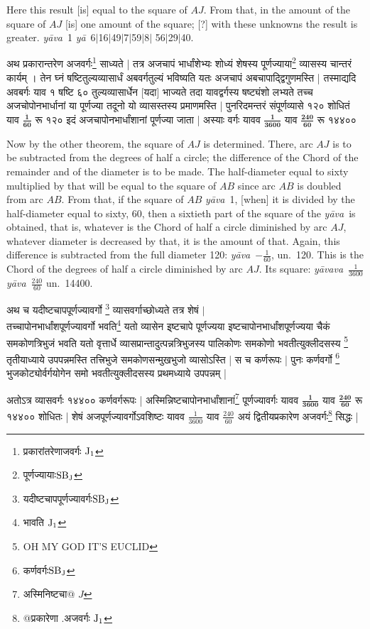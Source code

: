 \documentclass[11pt,a5paper]{book}
\def\ya{\textit{y\=a}}
\def\yava{\textit{y\=ava}}
\def\yavava{\textit{y\=avava}}
\def\danda{$|$}
\begin{document}
Here this result [is] equal to the square of $AJ$. From that, in the amount of the 
square of $AJ$ [is] one amount of the square; [?] with these unknowns the result 
is greater. \yava\ 1 \ya\ 6\danda 16\danda 49\danda 7\danda 59\danda 8\danda
56\danda 29\danda 40. 

\newpage
{\s अथ
प्रकारान्तरेण अजवर्गः\footnote{{\s प्रकारांतरेणाजवर्गः }${\rm J_1}$}
साध्यते |
तत्र अजचापं भार्धांशेभ्यः शोध्यं शेषस्य
पूर्णज्याया\footnote{{\s पूर्णज्यायाः}${\rm SB_J}$} व्यासस्य चान्तरं कार्यम् । तेन घ्नं षष्टितुल्यव्यासार्धं
अबवर्गतुल्यं भविष्यति
यतः अजचापं अबचापाद्द्विगुणमस्ति |
तस्माद्यदि अवबर्गः
याव १ षष्टि ६० तुल्यव्यासार्धेन [यदा] भाज्यते तदा यावद्वर्गस्य
षष्ट्यंशो लभ्यते तच्च अजचोपोनभार्धानां या पूर्णज्या
तदूनो यो व्यासस्तस्य प्रमाणमस्ति |
पुनरिदमन्तरं संपूर्णव्यासे १२० शोधितं
याव $\bm{\frac{\dot {1}}{60}}$ रू १२०
इदं अजचापोनभार्धांशानां पूर्णज्या जाता |
अस्याः वर्गः %
यावव $\bm{\frac{1}{3600}}$ याव $\bm{\frac{\dot{240}}{60}}$
रू १४४००}


\newpage
Now by the other theorem, the square of $AJ$ is determined. There, arc $AJ$ is to be subtracted
from the degrees of half a circle; the difference of the Chord of the remainder 
and of the diameter is to be made. The half-diameter equal to sixty multiplied by that
will be equal to the square of $AB$ since arc $AB$ is doubled from arc $AB$. 
From that, if the square of $AB$ \yava\ 1, [when] it is divided by the half-diameter equal to sixty, 60, 
then a sixtieth part of the square of the \yava\ is obtained, that is, whatever is the Chord of half a 
circle diminished by arc $AJ$, whatever diameter is decreased by that, it is the amount of that.
Again, this difference is subtracted from the full diameter 120:
\yava\ $-\frac{1}{60}$, un.\ 120. This is the Chord of the
degrees of half a circle diminished by arc $AJ$. Its square: 
\yavava\ $\frac{1}{3600}$ \yava\ $\frac{\dot{240}}{60}$ un.\ 14400.

\newpage
{\s अथ च यदीष्टचापपूर्णज्यावर्गो \footnote{{\s यदीष्टचापपूर्णज्यावर्गः}${\rm SB_J}$} व्यासवर्गाच्छोध्यते
तत्र शेषं
$|$ \\
तच्चापोनभार्धांशपूर्णज्यावर्गो
भवति\footnote{{\s भावति }${\rm J_1}$}
यतो व्यासेन इ्ष्टचापे पूर्णज्यया इष्टचापोनभार्धांशपूर्णज्यया
चैकं समकोणत्रि\-भुजं भवति यतो वृत्तार्धे व्यासप्रान्तादुत्पन्नत्रिभुजस्य
पालिकोणः समकोणो
भवतीत्युक्लीदसस्य \footnote{OH MY GOD IT'S EUCLID}
तृतीयाध्याये
उपपन्न\-मस्ति 
तत्त्रिभुजे
समकोणसन्मुखभुजो व्यासोऽस्ति |
स च कर्णरूपः |
पुनः कर्णवर्गो \footnote{{\s कर्णवर्गः}${\rm SB_J}$} भुजकोट्योर्वर्गयोगेन समो
भवतीत्युक्लीदसस्य
प्रथमध्याये
उपपन्नम् |

अतोऽत्र व्यासवर्गः १४४०० कर्णवर्गरूपः |
अस्मिन्निष्टचापोनभार्धांशानां\footnote{{\s अस्मिनिष्टचा@} $J$} पूर्णज्यावर्गः
यावव $\bm{\frac{1}{3600}}$ याव $\bm{\frac{\dot{240}}{60}}$
रू १४४००
शोधितः | शेषं अजपूर्णज्यावर्गोऽवशिष्टः 
यावव %
$\frac{\dot{1}}{3600}$ याव $\frac{240}{60}$ अयं
द्वितीयप्रकारेण अजवर्गः\footnote{{\s @प्रकारेणा .अजवर्गः }${\rm J_1}$}
सिद्धः |}
\end{document}
